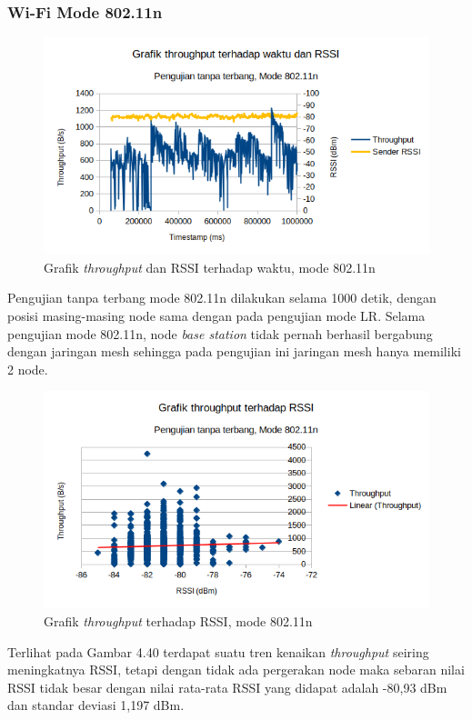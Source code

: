 \subsubsection{Wi-Fi Mode 802.11n}
\begin{figure}[H]
	\centering
	\includegraphics[scale=0.7]{./assets/Graphs/NoFly_11N/Throughput-Time}
	\caption{Grafik \textit{throughput} dan RSSI terhadap waktu, mode 802.11n}
\end{figure}
Pengujian tanpa terbang mode 802.11n dilakukan selama 1000 detik, dengan posisi masing-masing node sama dengan pada pengujian mode LR. Selama pengujian mode 802.11n, node \textit{base station} tidak pernah berhasil bergabung dengan jaringan mesh sehingga pada pengujian ini jaringan mesh hanya memiliki 2 node.
\begin{figure}[H]
	\centering
	\includegraphics[scale=0.7]{./assets/Graphs/NoFly_11N/Throughput-RSSI}
	\caption{Grafik \textit{throughput} terhadap RSSI, mode 802.11n}
\end{figure}
Terlihat pada Gambar 4.40 terdapat suatu tren kenaikan \textit{throughput} seiring meningkatnya RSSI, tetapi dengan tidak ada pergerakan node maka sebaran nilai RSSI tidak besar dengan nilai rata-rata RSSI yang didapat adalah -80,93 dBm dan standar deviasi 1,197 dBm.
